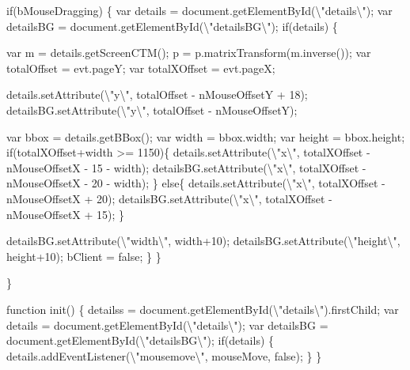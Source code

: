 \documentclass[11pt]{article}
\begin{document}
\begin{nwchunk}
         if(bMouseDragging) \{
             var details = document.getElementById({\textbackslash}"details{\textbackslash}");
             var detailsBG = document.getElementById({\textbackslash}"detailsBG{\textbackslash}");
             if(details) \{
         
                 var m = details.getScreenCTM();
                 p = p.matrixTransform(m.inverse());
                 var totalOffset = evt.pageY;
                 var totalXOffset = evt.pageX;
 
                 details.setAttribute({\textbackslash}"y{\textbackslash}", totalOffset - nMouseOffsetY + 18);
                 detailsBG.setAttribute({\textbackslash}"y{\textbackslash}", totalOffset - nMouseOffsetY);
                 
                 var bbox = details.getBBox();
                 var width = bbox.width;
                 var height = bbox.height;
                 if(totalXOffset+width >= 1150)\{
                     details.setAttribute({\textbackslash}"x{\textbackslash}", totalXOffset - nMouseOffsetX - 15 - width);
                     detailsBG.setAttribute({\textbackslash}"x{\textbackslash}", totalXOffset - nMouseOffsetX - 20 - width);
                 \}
                 else\{
                     details.setAttribute({\textbackslash}"x{\textbackslash}", totalXOffset - nMouseOffsetX + 20);              
                     detailsBG.setAttribute({\textbackslash}"x{\textbackslash}", totalXOffset - nMouseOffsetX + 15);              
                 \}
                 
                 detailsBG.setAttribute({\textbackslash}"width{\textbackslash}", width+10);
                 detailsBG.setAttribute({\textbackslash}"height{\textbackslash}", height+10);
                 bClient = false;
             \}
         \}
         
     \}
     
     function init() \{
         detailss = document.getElementById({\textbackslash}"details{\textbackslash}").firstChild; 
         var details = document.getElementById({\textbackslash}"details{\textbackslash}");
         var detailsBG = document.getElementById({\textbackslash}"detailsBG{\textbackslash}");
         if(details) \{
             details.addEventListener({\textbackslash}"mousemove{\textbackslash}", mouseMove, false);
         \}
     \}
     

\end{nwchunk}
\end{document}
